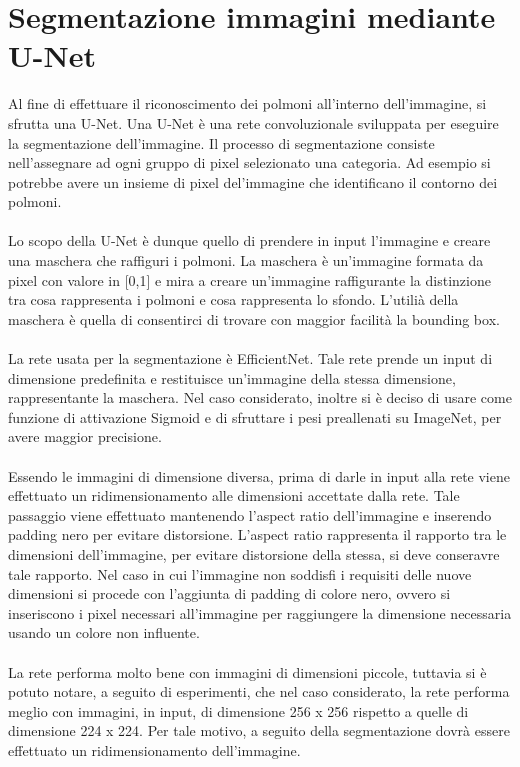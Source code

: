 \section{Segmentazione immagini mediante U-Net}
Al fine di effettuare il riconoscimento dei polmoni all'interno dell'immagine, si sfrutta una U-Net.
Una U-Net è una rete convoluzionale sviluppata per eseguire la segmentazione dell'immagine. Il processo di segmentazione consiste nell'assegnare ad 
ogni gruppo di pixel selezionato una categoria. Ad esempio si potrebbe avere un insieme di pixel del'immagine che identificano il contorno dei polmoni.
\\\\
Lo scopo della U-Net è dunque quello di prendere in input l'immagine e creare una maschera che raffiguri i polmoni.
La maschera è un'immagine formata da pixel con valore in [0,1] e mira a creare un'immagine raffigurante la distinzione tra cosa rappresenta 
i polmoni e cosa rappresenta lo sfondo.
L'utilià della maschera è quella di consentirci di trovare con maggior facilità la bounding box.
\\\\
La rete usata per la segmentazione è EfficientNet. Tale rete prende un input di dimensione predefinita e restituisce un'immagine della stessa
dimensione, rappresentante la maschera. Nel caso considerato, inoltre si è deciso di usare come funzione di attivazione Sigmoid e di sfruttare 
i pesi preallenati su ImageNet, per avere maggior precisione.
\\\\
Essendo le immagini di dimensione diversa, prima di darle in input alla rete viene effettuato un ridimensionamento alle dimensioni accettate dalla rete. 
Tale passaggio viene effettuato mantenendo l'aspect ratio dell'immagine e inserendo padding nero per evitare distorsione.
L'aspect ratio rappresenta il rapporto tra le dimensioni dell'immagine, per evitare distorsione della stessa, si deve conseravre tale rapporto.
Nel caso in cui l'immagine non soddisfi i requisiti delle nuove dimensioni si procede con l'aggiunta di padding di colore nero, ovvero si inseriscono i pixel necessari 
all'immagine per raggiungere la dimensione necessaria usando un colore non influente. 
\\\\
La rete performa molto bene con immagini di dimensioni piccole, tuttavia si è potuto notare, a seguito di esperimenti, che nel caso considerato, la rete 
performa meglio con immagini, in input, di dimensione 256 x 256 rispetto a quelle di dimensione 224 x 224.
Per tale motivo, a seguito della segmentazione dovrà essere effettuato un ridimensionamento dell'immagine.


